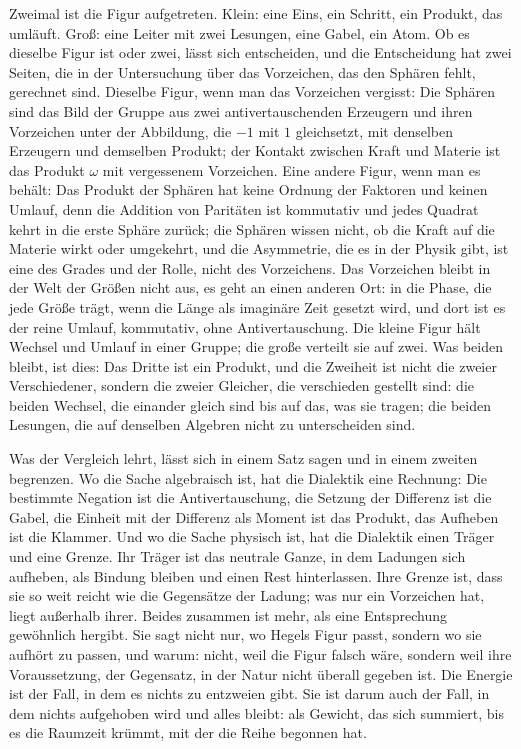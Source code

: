 \documentclass[11pt,a4paper]{article}
\begin{document}
Zweimal ist die Figur aufgetreten. Klein: eine Eins, ein Schritt, ein Produkt, das umläuft. Groß: eine Leiter mit zwei Lesungen, eine Gabel, ein Atom. Ob es dieselbe Figur ist oder zwei, lässt sich entscheiden, und die Entscheidung hat zwei Seiten, die in der Untersuchung über das Vorzeichen, das den Sphären fehlt, gerechnet sind. Dieselbe Figur, wenn man das Vorzeichen vergisst: Die Sphären sind das Bild der Gruppe aus zwei antivertauschenden Erzeugern und ihren Vorzeichen unter der Abbildung, die $-1$ mit $1$ gleichsetzt, mit denselben Erzeugern und demselben Produkt; der Kontakt zwischen Kraft und Materie ist das Produkt $\omega$ mit vergessenem Vorzeichen. Eine andere Figur, wenn man es behält: Das Produkt der Sphären hat keine Ordnung der Faktoren und keinen Umlauf, denn die Addition von Paritäten ist kommutativ und jedes Quadrat kehrt in die erste Sphäre zurück; die Sphären wissen nicht, ob die Kraft auf die Materie wirkt oder umgekehrt, und die Asymmetrie, die es in der Physik gibt, ist eine des Grades und der Rolle, nicht des Vorzeichens. Das Vorzeichen bleibt in der Welt der Größen nicht aus, es geht an einen anderen Ort: in die Phase, die jede Größe trägt, wenn die Länge als imaginäre Zeit gesetzt wird, und dort ist es der reine Umlauf, kommutativ, ohne Antivertauschung. Die kleine Figur hält Wechsel und Umlauf in einer Gruppe; die große verteilt sie auf zwei. Was beiden bleibt, ist dies: Das Dritte ist ein Produkt, und die Zweiheit ist nicht die zweier Verschiedener, sondern die zweier Gleicher, die verschieden gestellt sind: die beiden Wechsel, die einander gleich sind bis auf das, was sie tragen; die beiden Lesungen, die auf denselben Algebren nicht zu unterscheiden sind.

Was der Vergleich lehrt, lässt sich in einem Satz sagen und in einem zweiten begrenzen. Wo die Sache algebraisch ist, hat die Dialektik eine Rechnung: Die bestimmte Negation ist die Antivertauschung, die Setzung der Differenz ist die Gabel, die Einheit mit der Differenz als Moment ist das Produkt, das Aufheben ist die Klammer. Und wo die Sache physisch ist, hat die Dialektik einen Träger und eine Grenze. Ihr Träger ist das neutrale Ganze, in dem Ladungen sich aufheben, als Bindung bleiben und einen Rest hinterlassen. Ihre Grenze ist, dass sie so weit reicht wie die Gegensätze der Ladung; was nur ein Vorzeichen hat, liegt außerhalb ihrer. Beides zusammen ist mehr, als eine Entsprechung gewöhnlich hergibt. Sie sagt nicht nur, wo Hegels Figur passt, sondern wo sie aufhört zu passen, und warum: nicht, weil die Figur falsch wäre, sondern weil ihre Voraussetzung, der Gegensatz, in der Natur nicht überall gegeben ist. Die Energie ist der Fall, in dem es nichts zu entzweien gibt. Sie ist darum auch der Fall, in dem nichts aufgehoben wird und alles bleibt: als Gewicht, das sich summiert, bis es die Raumzeit krümmt, mit der die Reihe begonnen hat.
\end{document}
